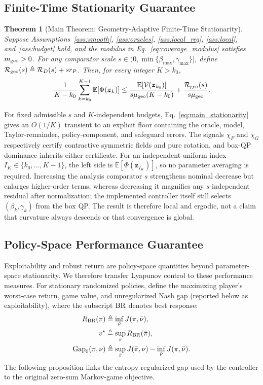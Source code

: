 \documentclass{article}
\newtheorem{theorem}{Theorem}
\theoremstyle{remark}
\newcommand{\E}{\mathbb{E}}
\newcommand{\bz}{\boldsymbol{z}}
\newcommand{\Vk}{\mathcal{V}}
\begin{document}
\subsection{Finite-Time Stationarity Guarantee}\label{subsec:ergodic}

\begin{theorem}[Main Theorem: Geometry-Adaptive Finite-Time Stationarity]\label{thm:ergodic}
Suppose Assumptions~\ref{ass:smooth}, \ref{ass:oracles}, \ref{ass:local_reg}, \ref{ass:local}, and~\ref{ass:budget} hold, and the modulus in Eq.~\eqref{eq:coverage_modulus} satisfies $m_{\rm geo}>0$.
For any comparator scale $s\in(0,\min\{\beta_{\max},\gamma_{\max}\}]$, define $\mathcal R_{\rm geo}(s)\triangleq\mathcal R_D(s)+sr_P$.
Then, for every integer $K>k_0$,
\begin{equation}\label{eq:main_stationarity}
\frac{1}{K-k_{0}}
\sum_{k=k_{0}}^{K-1}\E[\Phi(\bz_{k})]
\le
\frac{\E[\Vk(\bz_{k_{0}})]}{s\mu_{\rm geo}(K-k_{0})}
+
\frac{\mathcal R_{\rm geo}(s)}{s\mu_{\rm geo}}.
\end{equation}
\end{theorem}

For fixed admissible $s$ and $K$-independent budgets, Eq.~\eqref{eq:main_stationarity} gives an $O(1/K)$ transient to an explicit floor containing the oracle, model, Taylor-remainder, policy-component, and safeguard errors.
The signals $\chi_F$ and $\chi_G$ respectively certify contractive symmetric fields and pure rotation, and box-QP dominance inherits either certificate.
For an independent uniform index $I_K\in\{k_0,\ldots,K-1\}$, the left side is $\E[\Phi(\bz_{I_K})]$, so no parameter averaging is required.
Increasing the analysis comparator $s$ strengthens nominal decrease but enlarges higher-order terms, whereas decreasing it magnifies any $s$-independent residual after normalization; the implemented controller itself still selects $(\beta_k,\gamma_k)$ from the box QP.
The result is therefore local and ergodic, not a claim that curvature always descends or that convergence is global.

\subsection{Policy-Space Performance Guarantee}\label{subsec:performance_guarantee}

Exploitability and robust return are policy-space quantities beyond parameter-space stationarity.
We therefore transfer Lyapunov control to these performance measures.
For stationary randomized policies, define the maximizing player's worst-case return, game value, and unregularized Nash gap (reported below as exploitability), where the subscript ${\rm BR}$ denotes best response:
\begin{align}
R_{\rm BR}(\pi)&\triangleq\inf_{\bar\nu}J(\pi,\bar\nu),\notag\\
v^{\star}&\triangleq\sup_{\bar\pi}R_{\rm BR}(\bar\pi),\notag\\
\operatorname{Gap}_{0}(\pi,\nu)
&\triangleq
\sup_{\bar\pi}J(\bar\pi,\nu)-\inf_{\bar\nu}J(\pi,\bar\nu).
\label{eq:global_gap}
\end{align}
The following proposition links the entropy-regularized gap used by the controller to the original zero-sum Markov-game objective.
\end{document}
